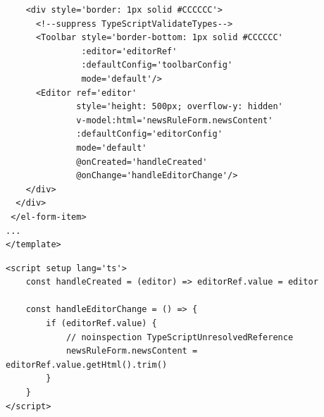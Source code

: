 \begin{itemize}
\begin{verbatim}
    <div style='border: 1px solid #CCCCCC'>
      <!--suppress TypeScriptValidateTypes-->
      <Toolbar style='border-bottom: 1px solid #CCCCCC'
               :editor='editorRef'
               :defaultConfig='toolbarConfig'
               mode='default'/>
      <Editor ref='editor'
              style='height: 500px; overflow-y: hidden'
              v-model:html='newsRuleForm.newsContent'
              :defaultConfig='editorConfig'
              mode='default'
              @onCreated='handleCreated'
              @onChange='handleEditorChange'/>
    </div>
  </div>
 </el-form-item>
...
</template>
	\end{verbatim}
	
	\begin{verbatim}
<script setup lang='ts'>
	const handleCreated = (editor) => editorRef.value = editor
	
	const handleEditorChange = () => {
		if (editorRef.value) {
			// noinspection TypeScriptUnresolvedReference
			newsRuleForm.newsContent = editorRef.value.getHtml().trim()
		}
	}
</script>
	\end{verbatim}
\end{itemize}

